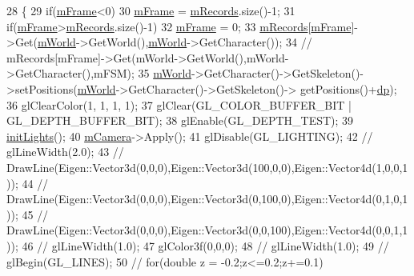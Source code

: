 \begin{DoxyCode}
28 \{
29     \textcolor{keywordflow}{if}(\hyperlink{class_v_p_c_1_1_g_u_i_1_1_sim_window_a639a2dd01463388074a24d18d6144832}{mFrame}<0)
30         \hyperlink{class_v_p_c_1_1_g_u_i_1_1_sim_window_a639a2dd01463388074a24d18d6144832}{mFrame} = \hyperlink{class_v_p_c_1_1_g_u_i_1_1_sim_window_ac03e0d1150d2500065462383074d38df}{mRecords}.size()-1;
31     \textcolor{keywordflow}{if}(\hyperlink{class_v_p_c_1_1_g_u_i_1_1_sim_window_a639a2dd01463388074a24d18d6144832}{mFrame}>\hyperlink{class_v_p_c_1_1_g_u_i_1_1_sim_window_ac03e0d1150d2500065462383074d38df}{mRecords}.size()-1)
32         \hyperlink{class_v_p_c_1_1_g_u_i_1_1_sim_window_a639a2dd01463388074a24d18d6144832}{mFrame} = 0;   
33      \hyperlink{class_v_p_c_1_1_g_u_i_1_1_sim_window_ac03e0d1150d2500065462383074d38df}{mRecords}[\hyperlink{class_v_p_c_1_1_g_u_i_1_1_sim_window_a639a2dd01463388074a24d18d6144832}{mFrame}]->Get(\hyperlink{class_v_p_c_1_1_g_u_i_1_1_sim_window_a8a2dc03c2b159164e3a1d27e6de8774d}{mWorld}->GetWorld(),\hyperlink{class_v_p_c_1_1_g_u_i_1_1_sim_window_a8a2dc03c2b159164e3a1d27e6de8774d}{mWorld}->GetCharacter());
34 \textcolor{comment}{//    mRecords[mFrame]->Get(mWorld->GetWorld(),mWorld->GetCharacter(),mFSM);}
35     \hyperlink{class_v_p_c_1_1_g_u_i_1_1_sim_window_a8a2dc03c2b159164e3a1d27e6de8774d}{mWorld}->GetCharacter()->GetSkeleton()->setPositions(\hyperlink{class_v_p_c_1_1_g_u_i_1_1_sim_window_a8a2dc03c2b159164e3a1d27e6de8774d}{mWorld}->GetCharacter()->GetSkeleton()->
      getPositions()+\hyperlink{class_v_p_c_1_1_g_u_i_1_1_sim_window_a144f2ee38a2a5e72b3b7d9d2505bd23e}{dp});
36     glClearColor(1, 1, 1, 1);
37     glClear(GL\_COLOR\_BUFFER\_BIT | GL\_DEPTH\_BUFFER\_BIT);
38     glEnable(GL\_DEPTH\_TEST);
39     \hyperlink{class_v_p_c_1_1_g_u_i_1_1_g_l_u_t_window_a216d92bb142c672c42a69e5fd9163746}{initLights}();
40     \hyperlink{class_v_p_c_1_1_g_u_i_1_1_g_l_u_t_window_a188317ab66f82a4c1752797c8f77cc30}{mCamera}->Apply();
41     glDisable(GL\_LIGHTING);
42     \textcolor{comment}{// glLineWidth(2.0);}
43     \textcolor{comment}{// DrawLine(Eigen::Vector3d(0,0,0),Eigen::Vector3d(100,0,0),Eigen::Vector4d(1,0,0,1));}
44     \textcolor{comment}{// DrawLine(Eigen::Vector3d(0,0,0),Eigen::Vector3d(0,100,0),Eigen::Vector4d(0,1,0,1));}
45     \textcolor{comment}{// DrawLine(Eigen::Vector3d(0,0,0),Eigen::Vector3d(0,0,100),Eigen::Vector4d(0,0,1,1));}
46     \textcolor{comment}{// glLineWidth(1.0);}
47     glColor3f(0,0,0);
48     \textcolor{comment}{// glLineWidth(1.0);}
49     \textcolor{comment}{// glBegin(GL\_LINES);}
50     \textcolor{comment}{// for(double z = -0.2;z<=0.2;z+=0.1)}

\end{DoxyCode}
